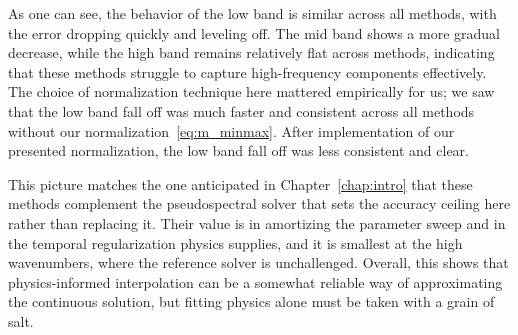 As one can see, the behavior of the low band is similar across all methods, with the error dropping quickly and leveling off. The mid band shows a more gradual decrease, while the high band remains relatively flat across methods, indicating that these methods struggle to capture high-frequency components effectively. The choice of normalization technique here mattered empirically for us; we saw that the low band fall off was much faster and consistent across all methods without our normalization~\eqref{eq:m_minmax}. After implementation of our presented normalization, the low band fall off was less consistent and clear.

This picture matches the one anticipated in Chapter~\ref{chap:intro} that these methods complement the pseudospectral solver that sets the accuracy ceiling here rather than replacing it. Their value is in amortizing the parameter sweep and in the temporal regularization physics supplies, and it is smallest at the high wavenumbers, where the reference solver is unchallenged. Overall, this shows that physics-informed interpolation can be a somewhat reliable way of approximating the continuous solution, but fitting physics alone must be taken with a grain of salt.
